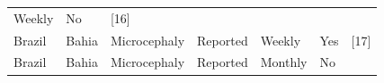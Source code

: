 \documentclass[10pt,letterpaper]{article}
\begin{document}
\begin{longtable}[]{@{}lllllll@{}}
\begin{minipage}[t]{0.04\columnwidth}
Weekly\strut
\end{minipage} & \begin{minipage}[t]{0.04\columnwidth}\raggedright\strut
No\strut
\end{minipage} & \begin{minipage}[t]{0.08\columnwidth}\raggedright\strut
{[}16{]}\strut
\end{minipage}\tabularnewline
\begin{minipage}[t]{0.03\columnwidth}\raggedright\strut
Brazil\strut
\end{minipage} & \begin{minipage}[t]{0.37\columnwidth}\raggedright\strut
Bahia\strut
\end{minipage} & \begin{minipage}[t]{0.08\columnwidth}\raggedright\strut
Microcephaly\strut
\end{minipage} & \begin{minipage}[t]{0.17\columnwidth}\raggedright\strut
Reported\strut
\end{minipage} & \begin{minipage}[t]{0.04\columnwidth}\raggedright\strut
Weekly\strut
\end{minipage} & \begin{minipage}[t]{0.04\columnwidth}\raggedright\strut
Yes\strut
\end{minipage} & \begin{minipage}[t]{0.08\columnwidth}\raggedright\strut
{[}17{]}\strut
\end{minipage}\tabularnewline
\begin{minipage}[t]{0.03\columnwidth}\raggedright\strut
Brazil\strut
\end{minipage} & \begin{minipage}[t]{0.37\columnwidth}\raggedright\strut
Bahia\strut
\end{minipage} & \begin{minipage}[t]{0.08\columnwidth}\raggedright\strut
Microcephaly\strut
\end{minipage} & \begin{minipage}[t]{0.17\columnwidth}\raggedright\strut
Reported\strut
\end{minipage} & \begin{minipage}[t]{0.04\columnwidth}\raggedright\strut
Monthly\strut
\end{minipage} & \begin{minipage}[t]{0.04\columnwidth}\raggedright\strut
No\strut
\end{minipage} & \begin{minipage}[t]{0.08\columnwidth}\raggedright\strut

\end{minipage}
\end{longtable}
\end{document}
